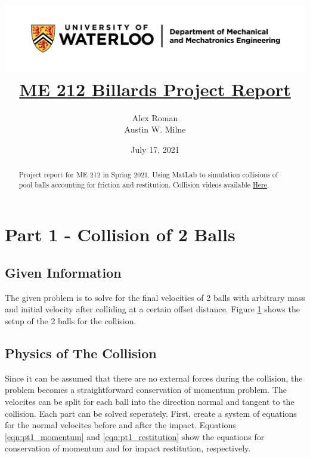 \documentclass[12pt]{article}
\title{
    \includegraphics[width=\linewidth]{resources/uwaterloo_mechanical_and_mechatronics_engineering/UWaterloo_Mechanical_and_Mechatronics_Engineering/PNG/UWaterloo_Mechanical_Mechatronics_Eng_Logo_horiz_rgb.png}
    \\[1cm]
    \underline{\bf{ME 212 Billards Project Report}}
}
\author{
    Alex Roman\\
    Austin W. Milne
}
\date{July 17, 2021}
\begin{document}
\maketitle
\vfill
\begin{abstract}
    Project report for ME 212 in Spring 2021. Using MatLab to simulation collisions of pool balls accounting for friction and restitution. Collision videos available \underline{\href{https://uofwaterloo-my.sharepoint.com/:f:/g/personal/awbmilne_uwaterloo_ca/EiWN90NLaUVGpE0EcLgVf8wBgqZj-v4eaprjO5gxFSzF4A?e=SygQLX}{Here}}.
\end{abstract}
\newpage

\tableofcontents
\listoftables
\listoffigures
\lstlistoflistings

\newpage


\section{Part 1 - Collision of 2 Balls}
\subsection{Given Information}
The given problem is to solve for the final velocities of 2 balls with arbitrary mass and initial velocity after colliding at a certain offset distance. Figure \ref{P1_diag} shows the setup of the 2 balls for the collision.

\begin{figure}[H]
    \centering
    
    \label{P1_diag}
\end{figure}

\subsection{Physics of The Collision}

Since it can be assumed that there are no external forces during the collision, the problem becomes a straightforward conservation of momentum problem. The velocites can be split for each ball into the direction normal and tangent to the collision. Each part can be solved seperately. First, create a system of equations for the normal velocites before and after the impact. Equations \ref{eqn:pt1_momentum} and \ref{eqn:pt1_restitution} show the equations for conservation of momentum and for impact restitution, respectively.
\end{document}
